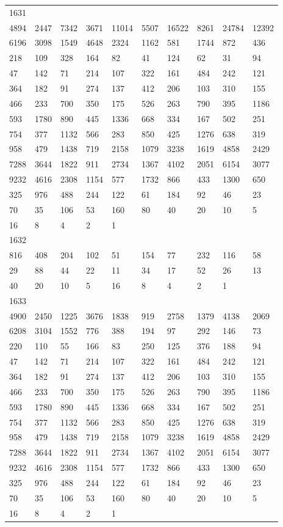 \begin{longtable}{*{10}{l}}
1631&&&&&&&&&\\
4894& 2447& 7342& 3671& 11014& 5507& 16522& 8261& 24784& 12392\\
6196& 3098& 1549& 4648& 2324& 1162& 581& 1744& 872& 436\\
218& 109& 328& 164& 82& 41& 124& 62& 31& 94\\
47& 142& 71& 214& 107& 322& 161& 484& 242& 121\\
364& 182& 91& 274& 137& 412& 206& 103& 310& 155\\
466& 233& 700& 350& 175& 526& 263& 790& 395& 1186\\
593& 1780& 890& 445& 1336& 668& 334& 167& 502& 251\\
754& 377& 1132& 566& 283& 850& 425& 1276& 638& 319\\
958& 479& 1438& 719& 2158& 1079& 3238& 1619& 4858& 2429\\
7288& 3644& 1822& 911& 2734& 1367& 4102& 2051& 6154& 3077\\
9232& 4616& 2308& 1154& 577& 1732& 866& 433& 1300& 650\\
325& 976& 488& 244& 122& 61& 184& 92& 46& 23\\
70& 35& 106& 53& 160& 80& 40& 20& 10& 5\\
16& 8& 4& 2& 1& \\

1632&&&&&&&&&\\
816& 408& 204& 102& 51& 154& 77& 232& 116& 58\\
29& 88& 44& 22& 11& 34& 17& 52& 26& 13\\
40& 20& 10& 5& 16& 8& 4& 2& 1& \\

1633&&&&&&&&&\\
4900& 2450& 1225& 3676& 1838& 919& 2758& 1379& 4138& 2069\\
6208& 3104& 1552& 776& 388& 194& 97& 292& 146& 73\\
220& 110& 55& 166& 83& 250& 125& 376& 188& 94\\
47& 142& 71& 214& 107& 322& 161& 484& 242& 121\\
364& 182& 91& 274& 137& 412& 206& 103& 310& 155\\
466& 233& 700& 350& 175& 526& 263& 790& 395& 1186\\
593& 1780& 890& 445& 1336& 668& 334& 167& 502& 251\\
754& 377& 1132& 566& 283& 850& 425& 1276& 638& 319\\
958& 479& 1438& 719& 2158& 1079& 3238& 1619& 4858& 2429\\
7288& 3644& 1822& 911& 2734& 1367& 4102& 2051& 6154& 3077\\
9232& 4616& 2308& 1154& 577& 1732& 866& 433& 1300& 650\\
325& 976& 488& 244& 122& 61& 184& 92& 46& 23\\
70& 35& 106& 53& 160& 80& 40& 20& 10& 5\\
16& 8& 4& 2& 1& \\


\end{longtable}
